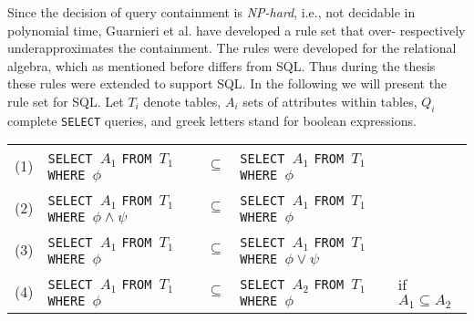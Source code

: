 Since the decision of query containment is \emph{NP-hard}, i.e., not decidable in polynomial time, Guarnieri et al. have developed a rule set that over- respectively underapproximates the containment.
%
The rules were developed for the relational algebra, which as mentioned before differs from SQL. 
%
Thus during the thesis these rules were extended to support SQL.
%
In the following we will present the rule set for SQL. 
%
Let $T_i$ denote tables, $A_i$ sets of attributes within tables, $Q_i$ complete \texttt{SELECT} queries, and greek letters stand for boolean expressions.
\newline
{\renewcommand{\arraystretch}{1.5}
\begin{center}
	\begin{longtable}{ p{5mm} p{40mm} p{5mm} p{25mm} p{25mm} }
	(1) \label{id} &
	\texttt{SELECT $A_1$} \newline
	\texttt{FROM $T_1$} \newline
	\texttt{WHERE $\phi$} &
	$\subseteq$ &
	\texttt{SELECT $A_1$} \newline
	\texttt{FROM $T_1$} \newline
	\texttt{WHERE $\phi$}&
	\\

	(2) \label{and} &
	\texttt{SELECT $A_1$} \newline
	\texttt{FROM $T_1$} \newline
	\texttt{WHERE $\phi \land \psi$} &
	$\subseteq$ &
	\texttt{SELECT $A_1$} \newline
	\texttt{FROM $T_1$} \newline
	\texttt{WHERE $\phi$}&
	\\
	
	(3) \label{or} &
	\texttt{SELECT $A_1$} \newline
	\texttt{FROM $T_1$} \newline
	\texttt{WHERE $\phi$} &
	$\subseteq$ &
	\texttt{SELECT $A_1$} \newline
	\texttt{FROM $T_1$} \newline
	\texttt{WHERE $\phi \lor \psi$}&
	\\
	
	(4) \label{proj} &
	\texttt{SELECT $A_1$} \newline
	\texttt{FROM $T_1$} \newline
	\texttt{WHERE $\phi$} &
	$\subseteq$ &
	\texttt{SELECT $A_2$} \newline
	\texttt{FROM $T_1$} \newline
	\texttt{WHERE $\phi$}&
	if $A_1 \subseteq A_2$
	\\
	

\end{longtable}
\end{center}}
